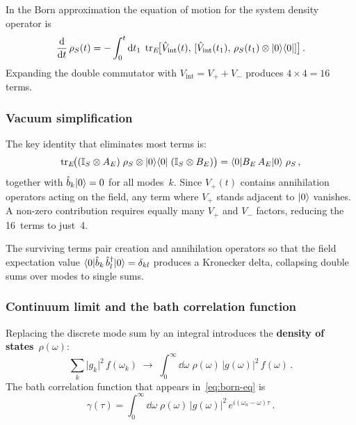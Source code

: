 In the Born approximation the equation of motion for the system
density operator is
\begin{equation}\label{eq:born-eq}
  \frac{\mathrm{d}}{\mathrm{d} t}\,\rho_S(t)
  = -\int_0^t \mathrm{d} t_1\;
    \operatorname{tr}_E\!\bigl[\hat{V}_{\mathrm{int}}(t),\,
    [\hat{V}_{\mathrm{int}}(t_1),\,\rho_S(t_1)\otimes\lvert 0 \rangle\langle 0 \rvert]\bigr]\,.
\end{equation}
Expanding the double commutator with $V_{\mathrm{int}} = V_+ + V_-$
produces $4 \times 4 = 16$ terms.

\subsubsection{Vacuum simplification}

The key identity that eliminates most terms is:
\begin{equation}\label{eq:vacuum-identity}
  \operatorname{tr}_E\!\bigl((\mathbb{I}_S \otimes A_E)\;\rho_S \otimes \lvert 0 \rangle\langle 0 \rvert
    \;(\mathbb{I}_S \otimes B_E)\bigr)
  = \langle 0 \rvert B_E\, A_E\lvert 0 \rangle\;\rho_S\,,
\end{equation}
together with $\hat{b}_k\lvert 0 \rangle = 0$ for all modes~$k$.  Since
$V_+(t)$ contains annihilation operators acting on the field, any term
where $V_+$ stands adjacent to $\lvert 0 \rangle$ vanishes.  A non-zero
contribution requires equally many $V_+$ and $V_-$ factors, reducing
the 16~terms to just~4.

\begin{remark}
  The surviving terms pair creation and annihilation operators so
  that the field expectation value
  $\langle 0 \rvert\hat{b}_k\,\hat{b}_l^\dagger\lvert 0 \rangle = \delta_{kl}$ produces
  a Kronecker delta, collapsing double sums over modes to single sums.
\end{remark}

\subsubsection{Continuum limit and the bath correlation function}

Replacing the discrete mode sum by an integral introduces the
\textbf{density of states}~$\rho(\omega)$:
\begin{equation}\label{eq:continuum-limit}
  \sum_k \lvert g_k\rvert^2\, f(\omega_k)
  \;\longrightarrow\;
  \int_0^\infty \dd\omega\;\rho(\omega)\,\lvert g(\omega)\rvert^2\,f(\omega)\,.
\end{equation}
The bath correlation function that appears in~\eqref{eq:born-eq} is
\begin{equation}\label{eq:gamma-tau}
  \gamma(\tau)
  = \int_0^\infty \dd\omega\;
    \rho(\omega)\,\lvert g(\omega)\rvert^2\,
    e^{i(\omega_a - \omega)\tau}\,.
\end{equation}

